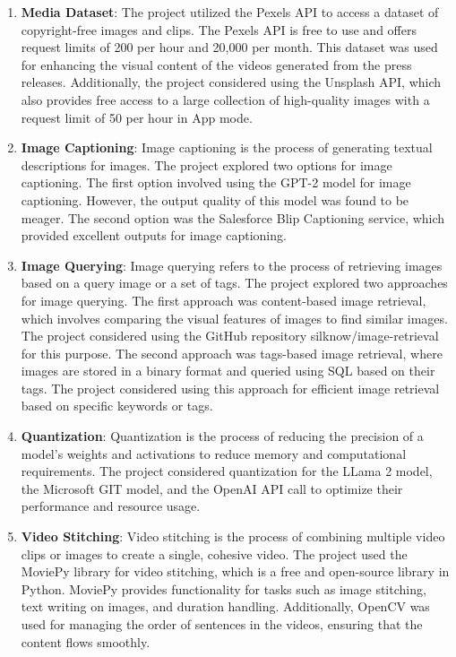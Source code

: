 \documentclass[12pt]{article}
\begin{document}
\begin{enumerate}
\item \textbf{Media Dataset}: The project utilized the Pexels API to access a dataset of copyright-free images and clips. The Pexels API is free to use and offers request limits of 200 per hour and 20,000 per month. This dataset was used for enhancing the visual content of the videos generated from the press releases. Additionally, the project considered using the Unsplash API, which also provides free access to a large collection of high-quality images with a request limit of 50 per hour in App mode.

\item \textbf{Image Captioning}: Image captioning is the process of generating textual descriptions for images. The project explored two options for image captioning. The first option involved using the GPT-2 model for image captioning. However, the output quality of this model was found to be meager. The second option was the Salesforce Blip Captioning service, which provided excellent outputs for image captioning.

\item \textbf{Image Querying}: Image querying refers to the process of retrieving images based on a query image or a set of tags. The project explored two approaches for image querying. The first approach was content-based image retrieval, which involves comparing the visual features of images to find similar images. The project considered using the GitHub repository silknow/image-retrieval for this purpose. The second approach was tags-based image retrieval, where images are stored in a binary format and queried using SQL based on their tags. The project considered using this approach for efficient image retrieval based on specific keywords or tags.

\item \textbf{Quantization}: Quantization is the process of reducing the precision of a model's weights and activations to reduce memory and computational requirements. The project considered quantization for the LLama 2 model, the Microsoft GIT model, and the OpenAI API call to optimize their performance and resource usage.

\item \textbf{Video Stitching}: Video stitching is the process of combining multiple video clips or images to create a single, cohesive video. The project used the MoviePy library for video stitching, which is a free and open-source library in Python. MoviePy provides functionality for tasks such as image stitching, text writing on images, and duration handling. Additionally, OpenCV was used for managing the order of sentences in the videos, ensuring that the content flows smoothly.


\end{enumerate}
\end{document}
